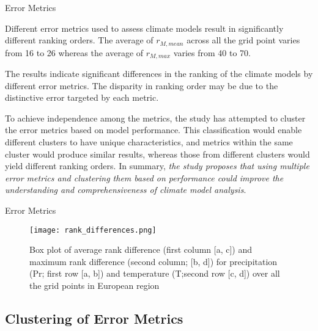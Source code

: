 \documentclass[xcolor={dvipsnames}]{beamer}
\begin{document}
\begin{frame}{Error Metrics}

Different error metrics used to assess climate models result in significantly different ranking orders. The average of $r_{M,mean}$ across all the grid point varies from 16 to 26 whereas the average of $r_{M, max}$ varies from 40 to 70. 

\pause

\hfill

The results indicate significant differences in the ranking of the climate models by different error metrics. The disparity in ranking order may be due to the distinctive error targeted by each metric.

\pause

\hfill

To achieve independence among the metrics, the study has attempted to cluster the error metrics based on model performance. This classification would enable different clusters to have unique characteristics, and metrics within the same cluster would produce similar results, whereas those from different clusters would yield different ranking orders. In summary, \textit{the study proposes that using multiple error metrics and clustering them based on performance could improve the understanding and comprehensiveness of climate model analysis}.

\end{frame}

\begin{frame}{Error Metrics}

\begin{figure}
    \centering
    \texttt{[image: rank\_differences.png]}
    \setlength{\abovecaptionskip}{0pt}
    \caption*{\tiny{Box plot of average rank difference (first column [a, c]) and maximum rank difference (second column; [b, d]) for precipitation (Pr; first row [a, b]) and temperature (T;second row [c, d]) over all the grid points in European region}}
    \label{fig:rank_differences}
\end{figure}
    
\end{frame}

\subsection{Clustering of Error Metrics}
\end{document}
